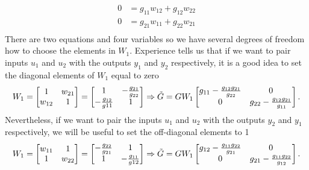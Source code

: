 \documentclass[a4paper,12pt,oneside,onecolumn]{article}
\begin{document}
\begin{equation}
\begin{aligned}
0 & = g_{11}w_{12}+g_{12}w_{22} \\
0 & = g_{21}w_{11}+g_{22}w_{21} \\
\end{aligned}
\end{equation}
There are two equations and four variables so we have several degrees of freedom how to choose the elements in $W_1$. Experience tells us that if we want to pair inputs $u_1$ and $u_2$ with the outputs $y_1$ and $y_2$ respectively, it is a good idea to set the diagonal elements of $W_1$ equal to zero
\begin{equation}
    W_1 = \begin{bmatrix}
    1 & w_{21} \\
    w_{12} & 1 \\
    \end{bmatrix}
    = \begin{bmatrix}
    1 & -\frac{g_{21}}{g_{22}} \\
    -\frac{g_{12}}{g{11}} & 1 \\
    \end{bmatrix} \Rightarrow \Tilde{G} = G W_1 \begin{bmatrix}
    g_{11} - \frac{g_{12}g_{21}}{g_{22}} & 0 \\
    0 & g_{22} - \frac{g_{12}g_{21}}{g_{11}} \\
    \end{bmatrix}.
\end{equation}
Nevertheless, if we want to pair the inputs $u_1$ and $u_2$ with the outputs $y_2$ and $y_1$ respectively, we will be useful to set the off-diagonal elements to 1
\begin{equation}
    W_1 = \begin{bmatrix}
    w_{11} & 1 \\
    1 & w_{22} \\
    \end{bmatrix}
    = \begin{bmatrix}
    -\frac{g_{22}}{g_{21}} & 1 \\
    1 & -\frac{g_{11}}{g{12}} \\
    \end{bmatrix} \Rightarrow \Tilde{G} = G W_1 \begin{bmatrix}
    g_{12} - \frac{g_{11}g_{22}}{g_{21}} & 0 \\
    0 & g_{21} - \frac{g_{11}g_{22}}{g_{12}} \\
    \end{bmatrix}.
\end{equation}
\end{document}
